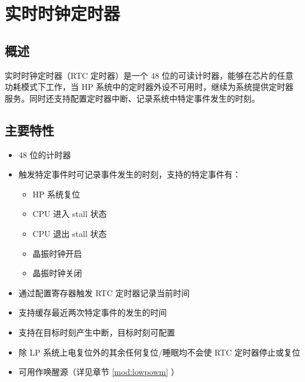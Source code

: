 \documentclass[main\_\_CN.tex]{subfiles}
\begin{document}

\ifglobal
\else
    \listoftodos
    {\let\clearpage\relax \listofdonetodos}
    \tableofcontents
\fi




\hypertarget{rtctimer}{}
\chapter{实时时钟定时器}
\label{mod:rtctimer}


\section{概述}

实时时钟定时器（RTC 定时器）是一个 48 位的可读计时器，能够在芯片的任意功耗模式下工作，当 HP 系统中的定时器外设不可用时，继续为系统提供定时器服务。同时还支持配置定时器中断、记录系统中特定事件发生的时刻。


\section{主要特性}
\label{sec:rtctimer-features}
\begin{itemize}
    \item 48 位的计时器
    \item 触发特定事件时可记录事件发生的时刻，支持的特定事件有：
    \begin{itemize}
        \item HP 系统复位
        \item CPU 进入 stall 状态
        \item CPU 退出 stall 状态
        \item 晶振时钟开启
        \item 晶振时钟关闭
    \end{itemize}
    \item 通过配置寄存器触发 RTC 定时器记录当前时间
    \item 支持缓存最近两次特定事件的发生的时间
    \item 支持在目标时刻产生中断，目标时刻可配置
    \item 除 LP 系统上电复位外的其余任何复位/睡眠均不会使 RTC 定时器停止或复位
    \item 可用作唤醒源（详见章节 \ref{mod:lowpowm} \textit{}）
\end{itemize}
\end{document}
